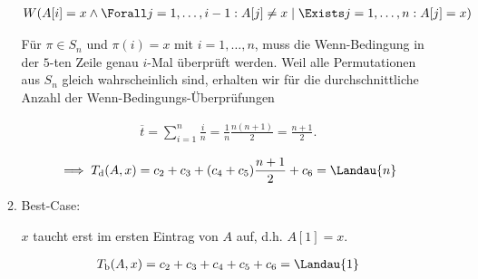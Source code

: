 \begin{solution}
\begin{enumerate}[label = (\alph*)]
\begin{enumerate}[label = \arabic*.]
    \begin{align*}
      W
      (
        A[i] = x
        \land
        \Forall j = 1, \dots, i-1:
        A[j] \neq x
        \mid
        \Exists j = 1, \dots, n:
        A[j] = x
      )
    \end{align*}

    Für $\pi \in S_n$ und $\pi(i) = x$ mit $i = 1, \dots, n$, muss die Wenn-Bedingung in der $5$-ten Zeile genau $i$-Mal überprüft werden.
    Weil alle Permutationen aus $S_n$ gleich wahrscheinlich sind, erhalten wir für die durchschnittliche Anzahl der Wenn-Bedingungs-Überprüfungen
    
    \begin{align*}
      \overline{t}
      =
      \sum_{i=1}^n \frac{i}{n}
      =
      \frac{1}{n} \frac{n (n + 1)}{2}
      =
      \frac{n + 1}{2}.
    \end{align*}

    \begin{align*}
      \implies
      T_{\mathrm{d}}(A, x)
      =
      c_2 + c_3 + (c_4 + c_5) \frac{n + 1}{2} + c_6
      =
      \Landau{n}
    \end{align*}  

    \item Best-Case:

    $x$ taucht erst im ersten Eintrag von $A$ auf, d.h. $A[1] = x$.

    \begin{align*}
      T_{\mathrm{b}}(A, x)
      =
      c_2 + c_3 + c_4 + c_5 + c_6
      =
      \Landau{1}
    \end{align*}
  
  \end{enumerate}

\end{enumerate}

\end{solution}


